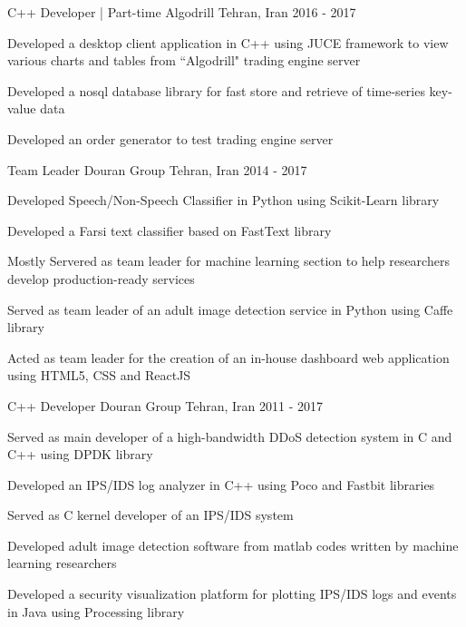 \begin{cventries}
  \cventry
    {C++ Developer | Part-time} %
    {Algodrill} %
    {Tehran, Iran} %
    {2016 - 2017} %
    {
      \begin{cvitems} %
        \item {Developed a desktop client application in C++ using JUCE framework to view various charts and tables
              from ``Algodrill" trading engine server}
        \item {Developed a nosql database library for fast store and retrieve of time-series key-value data}
        \item {Developed an order generator to test trading engine server}
      \end{cvitems}
    }

  \cventry
    {Team Leader} %
    {Douran Group} %
    {Tehran, Iran} %
    {2014 - 2017} %
    {
      \begin{cvitems} %
        \item Developed Speech/Non-Speech Classifier in Python using Scikit-Learn library
        \item Developed a Farsi text classifier based on FastText library
        \item Mostly Servered as team leader for machine learning section to help researchers develop production-ready services
        \item Served as team leader of an adult image detection service in Python using Caffe library
        \item Acted as team leader for the creation of an in-house dashboard web application using HTML5, CSS and ReactJS
      \end{cvitems}
    }

  \cventry
    {C++ Developer} %
    {Douran Group} %
    {Tehran, Iran} %
    {2011 - 2017} %
    {
      \begin{cvitems} %
        \item Served as main developer of a high-bandwidth DDoS detection system in C and C++ using DPDK library
        \item {Developed an IPS/IDS log analyzer in C++ using Poco and Fastbit libraries}
        \item {Served as C kernel developer of an IPS/IDS system}
        \item {Developed adult image detection software from matlab codes written by machine learning researchers}
        \item {Developed a security visualization platform for plotting IPS/IDS logs and events in Java using Processing library}
      \end{cvitems}
      }
      

\end{cventries}
